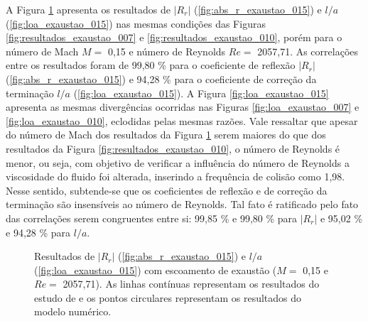 \newpage
A Figura \ref{fig:resultados_exaustao_015} apresenta os resultados de $|R_{r}|$ (\ref{fig:abs_r_exaustao_015}) e  $l/a$ (\ref{fig:loa_exaustao_015}) nas mesmas condições das Figuras \ref{fig:resultados_exaustao_007} e \ref{fig:resultados_exaustao_010}, porém para o número de Mach $M =$ 0,15 e número de Reynolds $Re =$ 2057,71.  As correlações entre os resultados foram de 99,80 \% para o coeficiente de reflexão $|R_{r}|$ (\ref{fig:abs_r_exaustao_015}) e 94,28 \% para o coeficiente de correção da terminação $l/a$ (\ref{fig:loa_exaustao_015}). A Figura \ref{fig:loa_exaustao_015} apresenta as mesmas divergências ocorridas nas Figuras \ref{fig:loa_exaustao_007} e \ref{fig:loa_exaustao_010}, eclodidas pelas mesmas razões. Vale ressaltar que apesar do número de Mach dos resultados da Figura \ref{fig:resultados_exaustao_015} serem maiores do que dos resultados da Figura \ref{fig:resultados_exaustao_010}, o número de Reynolds é menor, ou seja, com objetivo de verificar a influência do número de Reynolds a viscosidade do fluido foi alterada, inserindo a frequência de colisão como 1,98. Nesse sentido, subtende-se que os coeficientes de reflexão e de correção da terminação são insensíveis ao número de Reynolds. Tal fato é ratificado pelo fato das correlações serem congruentes entre si: 99,85 \% e 99,80 \% para $|R_{r}|$ e 95,02 \% e 94,28 \% para $l/a$.

\begin{figure}[ht!]
\begin{subfigure}{\scaleA \textwidth}
  
\end{subfigure}%
\begin{subfigure}{\scaleA \textwidth}
  
\end{subfigure}
\caption[Resultados de $|R_{r}|$ e $l/a$ com escoamento de exaustão (M $=$ 0,15 e Re $=$ 2057,71)]{Resultados de $|R_{r}|$ (\ref{fig:abs_r_exaustao_015}) e $l/a$ (\ref{fig:loa_exaustao_015}) com escoamento de exaustão ($M =$ 0,15 e $Re =$ 2057,71). As linhas contínuas representam os resultados do estudo de  e os pontos circulares representam os resultados do modelo numérico.}
\label{fig:resultados_exaustao_015}
\end{figure}

